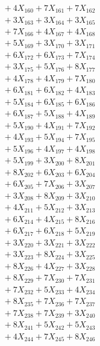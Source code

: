 \documentclass[a4paper,10pt]{article}
\begin{document}
{\begin{align}
&\;  + 4 X_{160} + 7 X_{161} + 7 X_{162} \\[0.3ex]
&\;  + 3 X_{163} + 3 X_{164} + 3 X_{165} \\[0.3ex]
&\;  + 7 X_{166} + 4 X_{167} + 4 X_{168} \\[0.3ex]
&\;  + 5 X_{169} + 3 X_{170} + 3 X_{171} \\[0.3ex]
&\;  + 6 X_{172} + 6 X_{173} + 7 X_{174} \\[0.3ex]
&\;  + 3 X_{175} + 5 X_{176} + 8 X_{177} \\[0.3ex]
&\;  + 4 X_{178} + 4 X_{179} + 7 X_{180} \\[0.3ex]
&\;  + 6 X_{181} + 6 X_{182} + 4 X_{183} \\[0.3ex]
&\;  + 5 X_{184} + 6 X_{185} + 6 X_{186} \\[0.3ex]
&\;  + 6 X_{187} + 5 X_{188} + 4 X_{189} \\[0.5ex]\allowbreak
&\;  + 5 X_{190} + 4 X_{191} + 7 X_{192} \\[0.3ex]
&\;  + 4 X_{193} + 5 X_{194} + 7 X_{195} \\[0.3ex]
&\;  + 5 X_{196} + 4 X_{197} + 4 X_{198} \\[0.3ex]
&\;  + 5 X_{199} + 3 X_{200} + 8 X_{201} \\[0.3ex]
&\;  + 8 X_{202} + 6 X_{203} + 6 X_{204} \\[0.3ex]
&\;  + 6 X_{205} + 7 X_{206} + 3 X_{207} \\[0.3ex]
&\;  + 3 X_{208} + 8 X_{209} + 3 X_{210} \\[0.3ex]
&\;  + 4 X_{211} + 5 X_{212} + 3 X_{213} \\[0.3ex]
&\;  + 6 X_{214} + 4 X_{215} + 8 X_{216} \\[0.3ex]
&\;  + 6 X_{217} + 6 X_{218} + 5 X_{219} \\[0.5ex]\allowbreak
&\;  + 3 X_{220} + 3 X_{221} + 3 X_{222} \\[0.3ex]
&\;  + 3 X_{223} + 8 X_{224} + 3 X_{225} \\[0.3ex]
&\;  + 8 X_{226} + 4 X_{227} + 3 X_{228} \\[0.3ex]
&\;  + 8 X_{229} + 7 X_{230} + 7 X_{231} \\[0.3ex]
&\;  + 7 X_{232} + 5 X_{233} + 4 X_{234} \\[0.3ex]
&\;  + 8 X_{235} + 7 X_{236} + 7 X_{237} \\[0.3ex]
&\;  + 7 X_{238} + 7 X_{239} + 3 X_{240} \\[0.3ex]
&\;  + 8 X_{241} + 5 X_{242} + 5 X_{243} \\[0.3ex]
&\;  + 4 X_{244} + 7 X_{245} + 8 X_{246} \\[0.3ex]

\end{align}}
\end{document}
